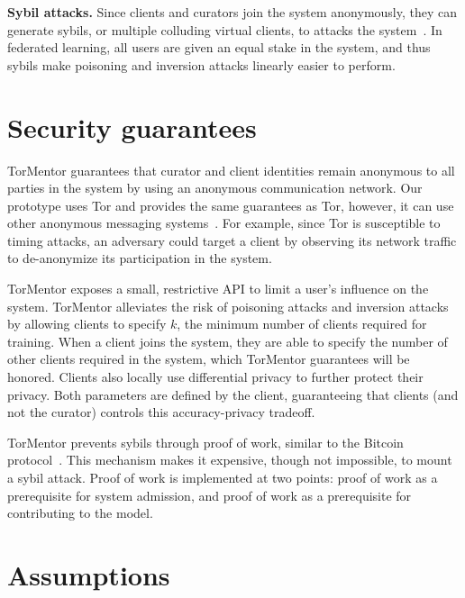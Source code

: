 \noindent \textbf{Sybil attacks.}  Since clients and curators join the
system anonymously, they can generate sybils, or multiple colluding
virtual clients, to attacks the system~\cite{Douceur:2002}. In
federated learning, all users are given an equal stake in the system,
and thus sybils make poisoning and inversion attacks linearly easier
to perform.

\section{Security guarantees} 

TorMentor guarantees that curator and client identities remain
anonymous to all parties in the system by using an anonymous
communication network. Our prototype uses Tor and provides the same
guarantees as Tor, however, it can use other anonymous
messaging systems~\cite{Vuvuzela:2015, Riposte:2015}. For example, since
Tor is susceptible to timing attacks, an adversary could target a
client by observing its network traffic to de-anonymize its
participation in the system. 

TorMentor exposes a small, restrictive API to limit a user's influence
on the system. TorMentor alleviates the risk of poisoning attacks and
inversion attacks by allowing clients to specify $k$, the minimum
number of clients required for training. When a client joins the
system, they are able to specify the number of other clients required
in the system, which TorMentor guarantees will be honored. Clients
also locally use differential privacy to further protect their privacy.
Both parameters are defined by the client, guaranteeing that clients (and not
the curator) controls this accuracy-privacy tradeoff.


TorMentor prevents sybils through proof of work, similar to the Bitcoin
protocol~\cite{Nakamoto:2009}. This mechanism makes it expensive,
though not impossible, to mount a sybil attack. Proof of work is
implemented at two points: proof of work as a prerequisite for system
admission, and proof of work as a prerequisite for contributing to the
model.

\section{Assumptions}

